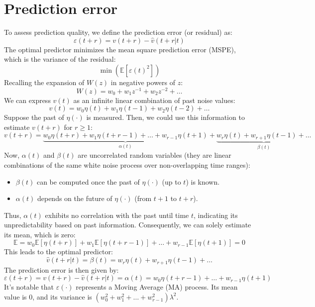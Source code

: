 \section{Prediction error}

To assess prediction quality, we define the prediction error (or residual) as:
\[\varepsilon(t+r)=v(t+r)-\hat{v}(t+r|t)\]
The optimal predictor minimizes the mean square prediction error (MSPE), which is the variance of the residual:
\[\min\left( \mathbb{E}\left[\varepsilon(t)^2 \right] \right)\]
Recalling the expansion of $W(z)$ in negative powers of $z$: 
\[W(z)=w_0+w_1z^{-1}+w_2z^{-2}+\dots\]
We can express $v(t)$ as an infinite linear combination of past noise values:
\[v(t)=w_0\eta(t)+w_1\eta(t-1)+w_2\eta(t-2)+\dots\]
Suppose the past of $\eta(\cdot)$ is measured. 
Then, we could use this information to estimate $v(t+r)$ for $r \geq 1$: 
\[v(t+r)=\underbrace{w_0\eta(t+r)+w_1\eta(t+r-1)+\dots+w_{r-1}\eta(t+1)}_{\alpha(t)} +\underbrace{w_r\eta(t)+w_{r+1}\eta(t-1)+\dots}_{\beta(t)} \]
Now, $\alpha(t)$ and $\beta(t)$ are uncorrelated random variables (they are linear combinations of the same white noise process over non-overlapping time ranges):
\begin{itemize}
    \item $\beta(t)$ can be computed once the past of $\eta(\cdot)$ (up to $t$) is known. 
    \item $\alpha(t)$ depends on the future of $\eta(\cdot)$ (from $t+1$ to $t+r$). 
\end{itemize}
Thus, $\alpha(t)$ exhibits no correlation with the past until time $t$, indicating its unpredictability based on past information. 
Consequently, we can solely estimate its mean, which is zero:
\[\mathbb{E}=w_0\mathbb{E}\left[\eta(t+r)\right]+w_1\mathbb{E}\left[\eta(t+r-1)\right]+\dots+w_{r-1}\mathbb{E}\left[\eta(t+1)\right]=0\]
This leads to the optimal predictor:
\[\hat{v}(t+r|t)=\beta(t)=w_r\eta(t)+w_{r+1}\eta(t-1)+\dots\]
The prediction error is then given by:
\[\varepsilon(t+r)=v(t+r)-\hat{v}(t+r|t)=\alpha(t)=w_0\eta(t+r-1)+\dots+w_{r-1}\eta(t+1)\]
It's notable that $\varepsilon(\cdot)$ represents a Moving Average (MA) process. 
Its mean value is 0, and its variance is $(w_0^2 + w_1^2 + \dots + w_{r-1}^2)\lambda^2$.

